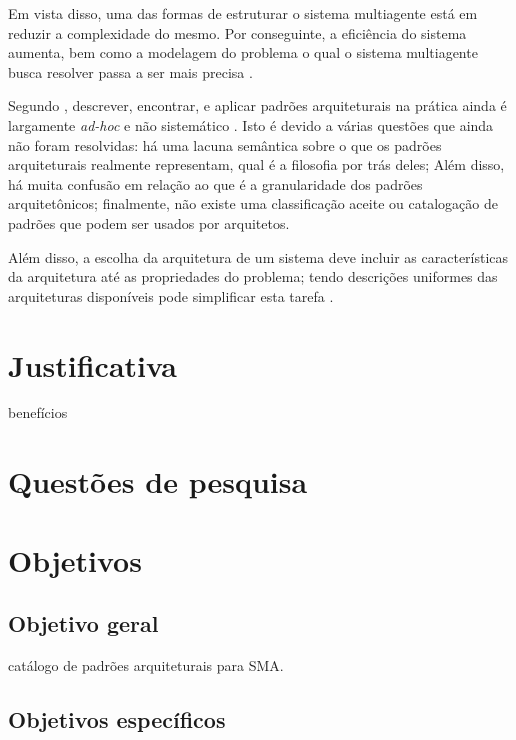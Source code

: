 Em vista disso, uma das formas de estruturar o sistema multiagente está em reduzir a complexidade do mesmo. Por conseguinte, a eficiência do sistema aumenta, bem como a modelagem do problema o qual o sistema multiagente busca resolver passa a ser mais precisa \cite[pág. 246]{livrao}.


Segundo , descrever, encontrar, e aplicar padrões arquiteturais na prática ainda é largamente \textit{ad-hoc} e não sistemático \cite{avgeriou2005}. Isto é devido a várias questões que ainda não foram resolvidas: há uma lacuna semântica sobre o que os padrões arquiteturais realmente representam, qual é a filosofia por trás deles; Além disso, há muita confusão em relação ao que é a granularidade dos padrões arquitetônicos; finalmente, não existe uma classificação aceite ou catalogação de padrões que podem ser usados por arquitetos.



Além disso, a escolha da arquitetura de um sistema deve incluir as características da arquitetura até as propriedades do problema; tendo descrições uniformes das arquiteturas disponíveis pode simplificar esta tarefa \cite{shaw1996}.


\section{Justificativa}

benefícios

\section{Questões de pesquisa}

\section{Objetivos}

\subsection{Objetivo geral}

catálogo de padrões
arquiteturais para SMA.

\subsection{Objetivos específicos}

